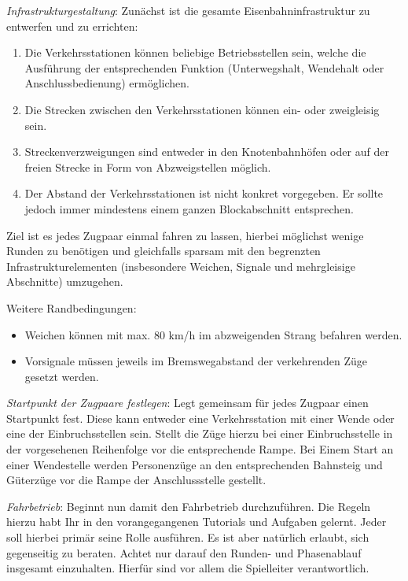   \task 
    \emph{Infrastrukturgestaltung}: Zunächst ist die gesamte Eisenbahninfrastruktur zu entwerfen und zu errichten:
    \begin{enumerate}[label=\alph*)]
      \item Die Verkehrsstationen können beliebige Betriebsstellen sein, welche die Ausführung der entsprechenden Funktion (Unterwegshalt, Wendehalt oder Anschlussbedienung) ermöglichen.
      \item Die Strecken zwischen den Verkehrsstationen können ein- oder zweigleisig sein.
      \item Streckenverzweigungen sind entweder in den Knotenbahnhöfen oder auf der freien Strecke in Form von Abzweigstellen möglich.
      \item Der Abstand der Verkehrsstationen ist nicht konkret vorgegeben. Er sollte jedoch immer mindestens einem ganzen Blockabschnitt entsprechen.
    \end{enumerate}

    Ziel ist es jedes Zugpaar einmal fahren zu lassen, hierbei möglichst wenige Runden zu benötigen und gleichfalls sparsam mit den begrenzten Infrastrukturelementen (insbesondere Weichen, Signale und mehrgleisige Abschnitte) umzugehen.

    Weitere Randbedingungen:
    \begin{itemize}
      \item Weichen können mit max. 80 km/h im abzweigenden Strang befahren werden.
      \item Vorsignale müssen jeweils im Bremswegabstand der verkehrenden Züge gesetzt werden.
    \end{itemize}

  \task
    \emph{Startpunkt der Zugpaare festlegen}: Legt gemeinsam für jedes Zugpaar einen Startpunkt fest. Diese kann entweder eine Verkehrsstation mit einer Wende oder eine der Einbruchsstellen sein. Stellt die Züge hierzu bei einer Einbruchsstelle in der vorgesehenen Reihenfolge vor die entsprechende Rampe. Bei Einem Start an einer Wendestelle werden Personenzüge an den entsprechenden Bahnsteig und Güterzüge vor die Rampe der Anschlussstelle gestellt.


  \task
    \emph{Fahrbetrieb}: Beginnt nun damit den Fahrbetrieb durchzuführen. Die Regeln hierzu habt Ihr in den vorangegangenen Tutorials und Aufgaben gelernt. Jeder soll hierbei primär seine Rolle ausführen. Es ist aber natürlich erlaubt, sich gegenseitig zu beraten. Achtet nur darauf den Runden- und Phasenablauf insgesamt einzuhalten. Hierfür sind vor allem die Spielleiter verantwortlich.

